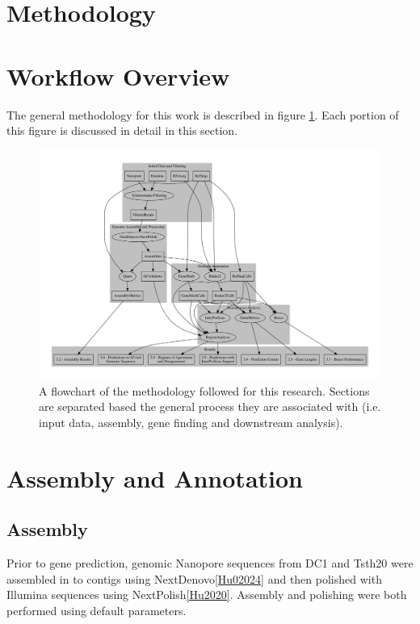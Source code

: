 \section{Methodology}

\section{Workflow Overview}

The general methodology for this work is described in figure
\ref{fig:workflow}. Each portion of this figure is discussed in detail
in this section.

\begin{center}
  \begin{figure}
    \includegraphics[width=1.15\textwidth]{./figures/data-flowchart.pdf}
    \caption{A flowchart of the methodology followed for this
      research. Sections are separated based the general process they
      are associated with (i.e. input data, assembly, gene finding and
      downstream analysis).}
    \label{fig:workflow}
  \end{figure}
\end{center}
      
\section{Assembly and Annotation}

\subsection{Assembly}

Prior to gene prediction, genomic Nanopore sequences from DC1 and
Tsth20 were assembled in to contigs using NextDenovo\ref{Hu02024} and
then polished with Illumina sequences using
NextPolish\ref{Hu2020}. Assembly and polishing were both performed
using default parameters.

